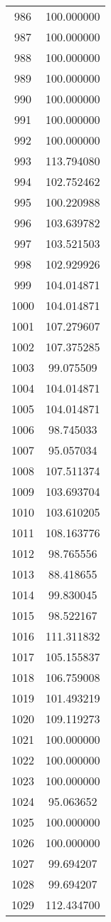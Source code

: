 \documentclass[12pt]{article}
\begin{document}
\begin{longtable}{@{}cc@{}}
986 & 100.000000 \\
987 & 100.000000 \\
988 & 100.000000 \\
989 & 100.000000 \\
990 & 100.000000 \\
991 & 100.000000 \\
992 & 100.000000 \\
993 & 113.794080 \\
994 & 102.752462 \\
995 & 100.220988 \\
996 & 103.639782 \\
997 & 103.521503 \\
998 & 102.929926 \\
999 & 104.014871 \\
1000 & 104.014871 \\
1001 & 107.279607 \\
1002 & 107.375285 \\
1003 & 99.075509 \\
1004 & 104.014871 \\
1005 & 104.014871 \\
1006 & 98.745033 \\
1007 & 95.057034 \\
1008 & 107.511374 \\
1009 & 103.693704 \\
1010 & 103.610205 \\
1011 & 108.163776 \\
1012 & 98.765556 \\
1013 & 88.418655 \\
1014 & 99.830045 \\
1015 & 98.522167 \\
1016 & 111.311832 \\
1017 & 105.155837 \\
1018 & 106.759008 \\
1019 & 101.493219 \\
1020 & 109.119273 \\
1021 & 100.000000 \\
1022 & 100.000000 \\
1023 & 100.000000 \\
1024 & 95.063652 \\
1025 & 100.000000 \\
1026 & 100.000000 \\
1027 & 99.694207 \\
1028 & 99.694207 \\
1029 & 112.434700 \\

\end{longtable}
\end{document}
